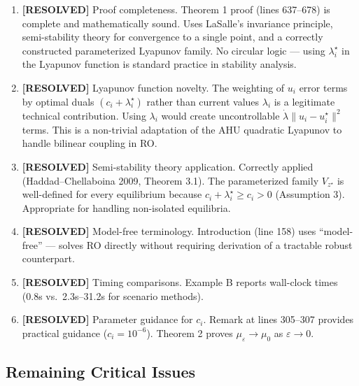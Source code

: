 \documentclass[journal,twoside,web]{ieeecolor}
\begin{document}
\begin{enumerate}
\item {\color{ForestGreen}\textbf{[RESOLVED]} Proof completeness.} Theorem 1 proof (lines 637--678) is complete and mathematically sound. Uses LaSalle's invariance principle, semi-stability theory for convergence to a single point, and a correctly constructed parameterized Lyapunov family. No circular logic --- using $\lambda_i^\star$ in the Lyapunov function is standard practice in stability analysis.

\item {\color{ForestGreen}\textbf{[RESOLVED]} Lyapunov function novelty.} The weighting of $u_i$ error terms by optimal duals $(c_i + \lambda_i^\star)$ rather than current values $\lambda_i$ is a legitimate technical contribution. Using $\lambda_i$ would create uncontrollable $\dot\lambda \|u_i - u_i^\star\|^2$ terms. This is a non-trivial adaptation of the AHU quadratic Lyapunov to handle bilinear coupling in RO.

\item {\color{ForestGreen}\textbf{[RESOLVED]} Semi-stability theory application.} Correctly applied (Haddad--Chellaboina 2009, Theorem 3.1). The parameterized family $V_{z^\star}$ is well-defined for every equilibrium because $c_i + \lambda_i^\star \geq c_i > 0$ (Assumption 3). Appropriate for handling non-isolated equilibria.

\item {\color{ForestGreen}\textbf{[RESOLVED]} Model-free terminology.} Introduction (line 158) uses ``model-free'' --- solves RO directly without requiring derivation of a tractable robust counterpart.

\item {\color{ForestGreen}\textbf{[RESOLVED]} Timing comparisons.} Example B reports wall-clock times (0.8s vs.\ 2.3s--31.2s for scenario methods).

\item {\color{ForestGreen}\textbf{[RESOLVED]} Parameter guidance for $c_i$.} Remark at lines 305--307 provides practical guidance ($c_i = 10^{-6}$). Theorem 2 proves $\mu_\varepsilon \to \mu_0$ as $\varepsilon \to 0$.
\end{enumerate}

\subsection*{Remaining Critical Issues}
\end{document}
